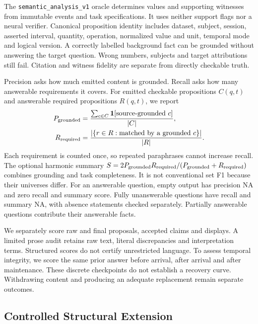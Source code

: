 The \texttt{semantic\_analysis\_v1} oracle determines values and supporting
witnesses from immutable events and task specifications. It uses neither support
flags nor a neural verifier. Canonical proposition identity includes dataset,
subject, session, asserted interval, quantity, operation, normalized value and
unit, temporal mode and logical version. A correctly labelled background fact
can be grounded without answering the target question. Wrong numbers, subjects
and target attributions still fail. Citation and witness fidelity are separate from directly checkable truth.

Precision asks how much emitted content is grounded. Recall asks how many
answerable requirements it covers. For emitted checkable propositions $C(q,t)$
and answerable required propositions $R(q,t)$, we report
\begin{equation}
\begin{aligned}
 P_{\rm grounded}&=\frac{\sum_{c\in C}\mathbf 1[\text{source-grounded }c]}{|C|},\\
 R_{\rm required}&=\frac{|\{r\in R:\text{matched by a grounded }c\}|}{|R|}.
\end{aligned}
 \label{eq:semanticmetrics}
\end{equation}
Each requirement is counted once, so repeated paraphrases cannot increase recall.
The optional harmonic summary $S=2P_{\rm grounded}R_{\rm required}/
(P_{\rm grounded}+R_{\rm required})$ combines grounding and task completeness.
It is not conventional set F1 because their universes differ. For an answerable
question, empty output has precision NA and zero recall and summary score.
Fully unanswerable questions have recall and summary NA, with absence statements
checked separately. Partially answerable questions contribute their answerable facts.

We separately score raw and final proposals, accepted claims and displays.
A limited prose audit retains raw text, literal discrepancies and interpretation terms. Structured scores do not certify unrestricted language.
To assess temporal integrity, we score the same prior answer before arrival,
after arrival and after maintenance. These discrete checkpoints do not establish
a recovery curve. Withdrawing content and producing an adequate replacement
remain separate outcomes.

\subsection{Controlled Structural Extension}

